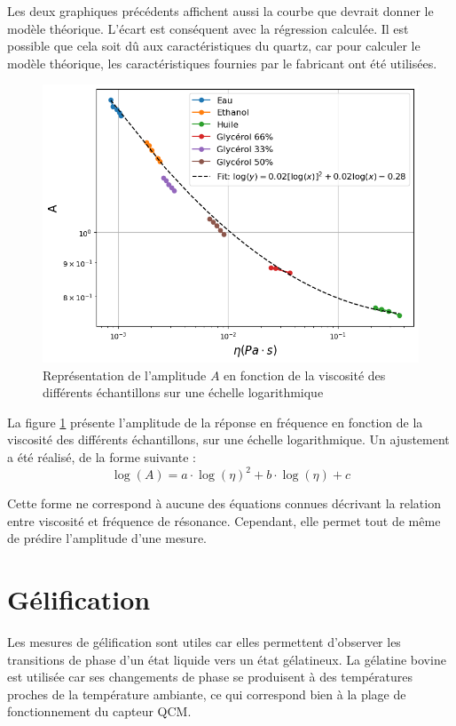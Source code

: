 Les deux graphiques précédents affichent aussi la courbe que devrait donner le modèle théorique.  
L'écart est conséquent avec la régression calculée.  
Il est possible que cela soit dû aux caractéristiques du quartz, car pour calculer le modèle théorique, les caractéristiques fournies par le fabricant ont été utilisées.
\newpage
\begin{figure}[H]
    \centering
    \includegraphics[width=\textwidth]{assets/figures/loglog.png}
    \caption{Représentation de l'amplitude $A$ en fonction de la viscosité des différents échantillons sur une échelle logarithmique}
    \label{fig:loglog}
\end{figure}

La figure \ref{fig:loglog} présente l’amplitude de la réponse en fréquence en fonction de la viscosité des différents échantillons, sur une échelle logarithmique.  
Un ajustement a été réalisé, de la forme suivante :
\begin{equation}
    \log(A) = a \cdot \log(\eta)^2 + b \cdot \log(\eta) + c
\end{equation}

Cette forme ne correspond à aucune des équations connues décrivant la relation entre viscosité et fréquence de résonance.  
Cependant, elle permet tout de même de prédire l’amplitude d’une mesure.
\newpage
\section{Gélification}

Les mesures de gélification sont utiles car elles permettent d'observer les transitions de phase d’un état liquide vers un état gélatineux. La gélatine bovine est utilisée car ses changements de phase se produisent à des températures proches de la température ambiante, ce qui correspond bien à la plage de fonctionnement du capteur QCM.

